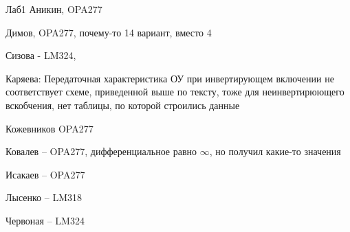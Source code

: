 \documentclass[a4paper,11pt]{article}
\begin{document}
\newpage
Лаб1
Аникин, OPA277  

Димов, OPA277, почему-то 14 вариант, вместо 4

Сизова - LM324, 

Каряева: Передаточная характеристика ОУ при инвертирующем включении не соответствует схеме, приведенной выше по тексту, тоже для неинвертирюющего вскобчения,
нет таблицы, по которой строились данные

Кожевников OPA277

Ковалев -- OPA277, дифференциальное равно $\infty$, но получил какие-то значения

Исакаев   -- OPA277

Лысенко -- LM318

Червоная -- LM324
\end{document}

